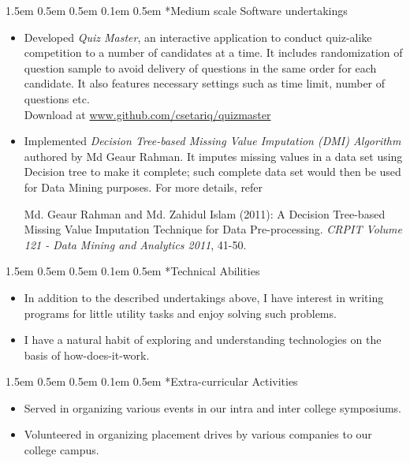 \documentclass[a4paper, 12pt]{article}
\makeatletter
\renewcommand\section{\@startsection{section}{1}{\z@}%
                                  {1.5em \@plus 0.5em \@minus 0.5em}%
                                  {0.1em \@plus 0.5em}%
                                  {\small\bfseries\sc}}
\makeatother
\begin{document}
\section*{Medium scale Software undertakings}
\begin{adjustwidth}{1.3em}{0pt}
\begin{itemize}
	\item Developed \emph{Quiz Master}, an interactive application to conduct quiz-alike competition to a number of candidates at a time. It includes randomization of question sample to avoid delivery of questions in the same order for each candidate. It also features necessary settings such as time limit, number of questions etc.\\
	Download at \url{www.github.com/csetariq/quizmaster}
	\item Implemented \emph{Decision Tree-based Missing Value Imputation (DMI) Algorithm} authored by Md Geaur Rahman. It imputes missing values in a data set using Decision tree to make it complete; such complete data set would then be used for Data Mining purposes. For more details, refer
	\begin{adjustwidth}{2.5em}{2.5em}
	Md. Geaur Rahman and Md. Zahidul Islam (2011): A Decision Tree-based Missing Value Imputation Technique for Data Pre-processing. \emph{CRPIT Volume 121 - Data Mining and Analytics 2011}, 41-50.
	\end{adjustwidth}
\end{itemize}
\end{adjustwidth}

\section*{Technical Abilities}
\begin{adjustwidth}{1.3em}{0pt}
\begin{itemize}
	\item In addition to the described undertakings above, I have interest in writing programs for little utility tasks and enjoy solving such problems.
	\item I have a natural habit of exploring and understanding technologies on the basis of how-does-it-work.
\end{itemize}
\end{adjustwidth}

\section*{Extra-curricular Activities}
\begin{adjustwidth}{1.3em}{0pt}
\begin{itemize}
	\item Served in organizing various events in our intra and inter college symposiums.
	\item Volunteered in organizing placement drives by various companies to our college campus.
\end{itemize}
\end{adjustwidth}
\end{document}
